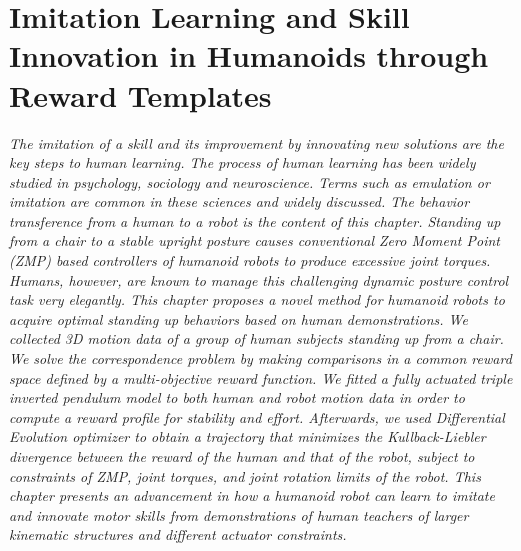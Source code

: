 \chapter{Imitation Learning and Skill Innovation in Humanoids through Reward Templates}\label{ch_imitation}
\textit{The imitation of a skill and its improvement by innovating new solutions are  the key steps to human learning. The process of human learning  has been widely studied in psychology, sociology and neuroscience. Terms such as emulation or imitation are common in these sciences and widely discussed. The behavior transference from a human to a robot is the content of this chapter. Standing up from a chair to a stable upright posture causes conventional Zero Moment Point (ZMP) based controllers of humanoid robots to produce excessive joint torques. Humans, however, are known to manage this challenging dynamic posture control task very elegantly. This chapter proposes a novel method for humanoid robots to acquire optimal standing up behaviors based on human demonstrations. We collected 3D motion data of a group of human subjects standing up from a chair.  We solve the correspondence problem by making comparisons in a common reward space defined by a multi-objective reward function. We fitted a fully actuated triple inverted pendulum model to both human and robot motion data in order to compute a reward profile for stability and effort.  Afterwards, we used Differential Evolution optimizer to obtain a trajectory that minimizes the Kullback-Liebler divergence between the reward of the human and that of the robot, subject to constraints of ZMP, joint torques, and joint rotation limits of the robot.
This chapter presents an advancement in how a humanoid robot can learn to imitate and innovate motor skills from demonstrations of human teachers of larger kinematic structures and different actuator constraints. %
}
\newpage






